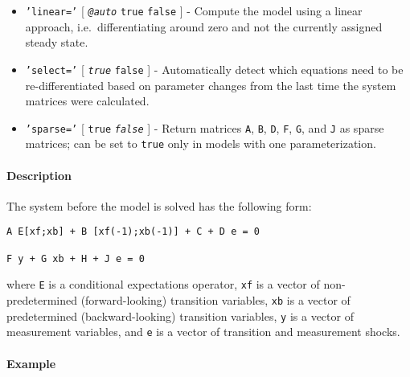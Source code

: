 \begin{itemize}
\item
  \texttt{'linear='} {[} \emph{\texttt{@auto}} \textbar{} \texttt{true}
  \textbar{} \texttt{false} {]} - Compute the model using a linear
  approach, i.e.~differentiating around zero and not the currently
  assigned steady state.
\item
  \texttt{'select='} {[} \emph{\texttt{true}} \textbar{} \texttt{false}
  {]} - Automatically detect which equations need to be
  re-differentiated based on parameter changes from the last time the
  system matrices were calculated.
\item
  \texttt{'sparse='} {[} \texttt{true} \textbar{} \emph{\texttt{false}}
  {]} - Return matrices \texttt{A}, \texttt{B}, \texttt{D}, \texttt{F},
  \texttt{G}, and \texttt{J} as sparse matrices; can be set to
  \texttt{true} only in models with one parameterization.
\end{itemize}

\paragraph{Description}

The system before the model is solved has the following form:

\begin{verbatim}
A E[xf;xb] + B [xf(-1);xb(-1)] + C + D e = 0

F y + G xb + H + J e = 0
\end{verbatim}

where \texttt{E} is a conditional expectations operator, \texttt{xf} is
a vector of non-predetermined (forward-looking) transition variables,
\texttt{xb} is a vector of predetermined (backward-looking) transition
variables, \texttt{y} is a vector of measurement variables, and
\texttt{e} is a vector of transition and measurement shocks.

\paragraph{Example}


